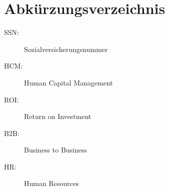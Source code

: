 
\section *{Abkürzungsverzeichnis} %
\begin{description}
\item[SSN:] Sozialversicherungsnummer
\item[HCM:] Human Capital Management
\item[ROI:] Return on Investment
\item[B2B:] Business to Business
\item[HR:] Human Resources   
\end{description}
